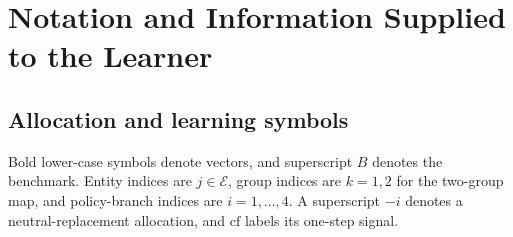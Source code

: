 \documentclass[10pt]{article}
\begin{document}
\section{Notation and Information Supplied to the Learner}
\label{app:notation}

\subsection{Allocation and learning symbols}

Bold lower-case symbols denote vectors, and superscript $B$ denotes the benchmark. Entity indices are $j\in\mathcal E$, group indices are $k=1,2$ for the two-group map, and policy-branch indices are $i=1,\ldots,4$. A superscript $-i$ denotes a neutral-replacement allocation, and $\mathrm{cf}$ labels its one-step signal.
\end{document}
